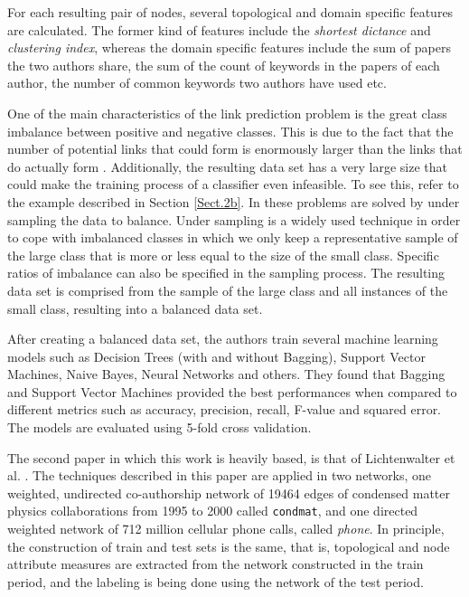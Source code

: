 \documentclass{acm_proc_article-sp}
\begin{document}
For each resulting pair of nodes, several topological and domain specific features are calculated. The former kind of features include the \textit{shortest dictance} and \textit{clustering index}, whereas the domain specific features include the sum of papers the two authors share, the sum of the count of keywords in the papers of each author, the number of common keywords two authors have used etc. 

One of the main characteristics of the link prediction problem is the great class imbalance between positive and negative classes. This is due to the fact that the number of potential links that could form is enormously larger than the links that do actually form \cite{Lichtenwalter:2010:NPM:1835804.1835837}. Additionally, the resulting data set has a very large size that could make the training process of a classifier even infeasible. To see this, refer to the example described in Section \ref{Sect.2b}. In \cite{Hasan06linkprediction} these problems are solved by under sampling the data to balance. Under sampling is a widely used technique in order to cope with imbalanced classes in which we only keep a representative sample of the large class that is more or less equal to the size of the small class. Specific ratios of imbalance can also be specified in the sampling process. The resulting data set is comprised from the sample of the large class and all instances of the small class, resulting into a balanced data set. 

After creating a balanced data set, the authors train several machine learning models such as Decision Trees (with and without Bagging), Support Vector Machines, Naive Bayes, Neural Networks and others. They found that Bagging and Support Vector Machines provided the best performances when compared to different metrics such as accuracy, precision, recall, F-value and squared error. The models are evaluated using 5-fold cross validation.

The second paper in which this work is heavily based, is that of Lichtenwalter et al. \cite{Lichtenwalter:2010:NPM:1835804.1835837}. The techniques described in this paper are applied in two networks, one weighted, undirected co-authorship network of 19464 edges of condensed matter physics collaborations from 1995 to 2000 called \texttt{condmat}, and one directed weighted network of 712 million cellular phone calls, called \textit{phone}. In principle, the construction of train and test sets is the same, that is, topological and node attribute measures are extracted from the network constructed in the train period, and the labeling is being done using the network of the test period.
\end{document}
